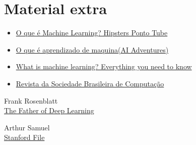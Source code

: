 \documentclass{article}
\begin{document}
    \newpage
    \section*{\centering Material extra}\label{sec:extra} %

    \begin{itemize}
        \item \href{https://www.youtube.com/watch?v=Iuz_jc96bQk}{O que é Machine Learning? Hipsters Ponto Tube}
        \item \href{https://www.youtube.com/watch?v=HcqpanDadyQ}{O que é aprendizado de maquina(AI Adventures)}
        \item \href{https://www.zdnet.com/article/what-is-machine-learning-everything-you-need-to-know/}{What is machine learning? Everything you need to know}
        \item \href{https://www.sbc.org.br/images/flippingbook/computacaobrasil/computa_39/pdf/CompBrasil_39_180.pdf}{Revista da Sociedade Brasileira de Computação}
    \end{itemize}

    \newpage

    \begin{thebibliography}{2}
        Frank Rosenblatt \\
        \href{http://www.csis.pace.edu/~ctappert/srd/b1.pdf}{The Father of Deep Learning} 
        
        Arthur Samuel \\
        \href{https://cs.stanford.edu/memoriam/professor-arthur-samuel}{Stanford  File} 
    \end{thebibliography}
    
\end{document}
